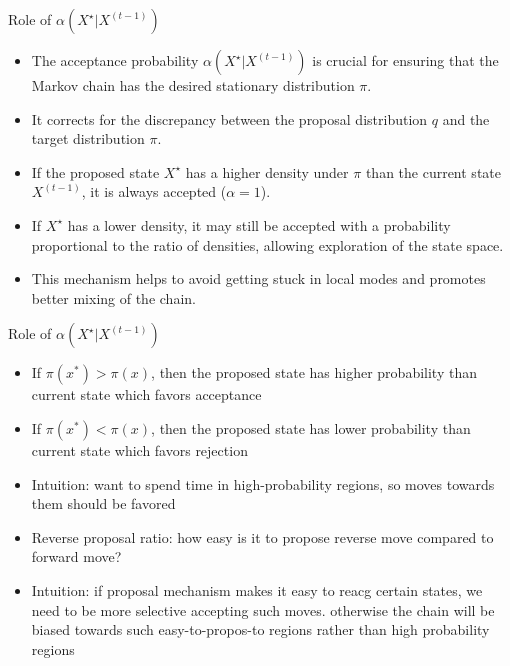 \documentclass[aspectratio=169]{beamer}
\begin{document}
\begin{frame}{Role of $\alpha(X^{\star} | X^{(t-1)})$}
	\begin{itemize}
		\item The acceptance probability $\alpha(X^{\star} | X^{(t-1)})$ is crucial for ensuring that the Markov chain has the desired stationary distribution $\pi$.
		\item It corrects for the discrepancy between the proposal distribution $q$ and the target distribution $\pi$.
		\item If the proposed state $X^{\star}$ has a higher density under $\pi$ than the current state $X^{(t-1)}$, it is always accepted ($\alpha = 1$).
		\item If $X^{\star}$ has a lower density, it may still be accepted with a probability proportional to the ratio of densities, allowing exploration of the state space.
		\item This mechanism helps to avoid getting stuck in local modes and promotes better mixing of the chain.
	\end{itemize}
\end{frame}

\begin{frame}{Role of $\alpha(X^{\star} | X^{(t-1)})$}
	\begin{itemize}
		\item If $\pi(x^*) > \pi(x)$, then the proposed state has higher probability than current state which favors acceptance
		\item If $\pi(x^*) < \pi(x)$, then the proposed state has lower probability than current state which favors rejection
		\item Intuition: want to spend time in high-probability regions, so moves towards them should be favored
		\item Reverse proposal ratio: how easy is it to propose reverse move compared to forward move?
		\item Intuition: if proposal mechanism makes it easy to reacg certain states,
		      we need to be more selective accepting such moves. otherwise the chain will be
		      biased towards such easy-to-propos-to regions rather than high probability regions
	\end{itemize}
\end{frame}
\end{document}
